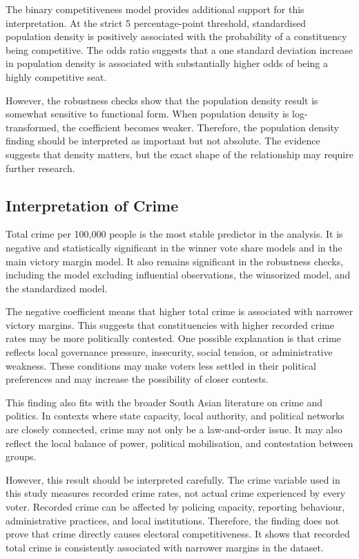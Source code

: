 \documentclass[12pt,a4paper]{article}
\begin{document}
The binary competitiveness model provides additional support for this interpretation. At the strict 5 percentage-point threshold, standardised population density is positively associated with the probability of a constituency being competitive. The odds ratio suggests that a one standard deviation increase in population density is associated with substantially higher odds of being a highly competitive seat.

However, the robustness checks show that the population density result is somewhat sensitive to functional form. When population density is log-transformed, the coefficient becomes weaker. Therefore, the population density finding should be interpreted as important but not absolute. The evidence suggests that density matters, but the exact shape of the relationship may require further research.

\subsection{Interpretation of Crime}

Total crime per 100,000 people is the most stable predictor in the analysis. It is negative and statistically significant in the winner vote share models and in the main victory margin model. It also remains significant in the robustness checks, including the model excluding influential observations, the winsorized model, and the standardized model.

The negative coefficient means that higher total crime is associated with narrower victory margins. This suggests that constituencies with higher recorded crime rates may be more politically contested. One possible explanation is that crime reflects local governance pressure, insecurity, social tension, or administrative weakness. These conditions may make voters less settled in their political preferences and may increase the possibility of closer contests.

This finding also fits with the broader South Asian literature on crime and politics. In contexts where state capacity, local authority, and political networks are closely connected, crime may not only be a law-and-order issue. It may also reflect the local balance of power, political mobilisation, and contestation between groups.

However, this result should be interpreted carefully. The crime variable used in this study measures recorded crime rates, not actual crime experienced by every voter. Recorded crime can be affected by policing capacity, reporting behaviour, administrative practices, and local institutions. Therefore, the finding does not prove that crime directly causes electoral competitiveness. It shows that recorded total crime is consistently associated with narrower margins in the dataset.
\end{document}
